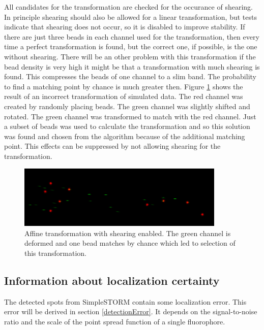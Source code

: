 All candidates for the transformation are checked for the occurance of shearing.
In principle shearing should also be allowed for a linear transformation, but tests
indicate that shearing does not occur, so it is disabled to improve stability. \newline 
If there are just
three beads in each channel used for the transformation, then every time a perfect transformation is found,
but the correct one, if possible, is the one without shearing. There will be an other problem with this transformation if the bead density is very high it might be that a transformation with much shearing is found. This compresses the beads of one channel to a slim band. The probability to find a matching point by chance is much greater then. \newline
Figure \ref{badshearing} shows the result of an incorrect transformation of simulated data. The red channel was created by randomly placing beads. The green channel was slightly shifted and rotated. The green channel was transformed to match with the red channel. Just a subset of beads was used to calculate the transformation and so this solution was found and chosen from the algorithm because of the additional matching point.\newline
This effects can be suppressed by not allowing shearing for the transformation.

\begin{figure}
\centering
\includegraphics[width = 0.88\textwidth]{pictures/shearingBad.png}
\caption{Affine transformation with shearing enabled. The green channel is deformed and one bead matches by chance which led to selection of this transformation.}
\label{badshearing}
\end{figure}
\subsection{Information about localization certainty}
The detected spots from SimpleSTORM contain some localization error. This error will be derived in section \ref{detectionError}. It depends on the signal-to-noise ratio and the scale of the point spread function of a single fluorophore.

